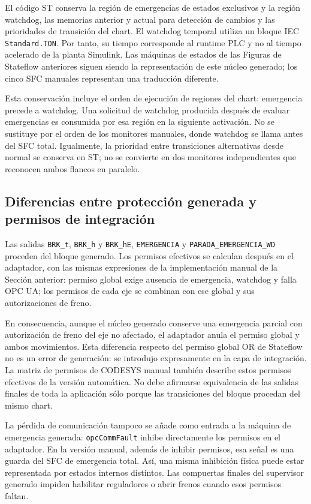 \documentclass[a4paper,10pt,onecolumn,journal]{ieeeconf}
\numberwithin{equation}{section}
\begin{document}
El código ST conserva la región de emergencias de estados exclusivos y la región watchdog, las memorias anterior y actual para detección de cambios y las prioridades de transición del chart. El watchdog temporal utiliza un bloque IEC \texttt{Standard.TON}. Por tanto, su tiempo corresponde al runtime PLC y no al tiempo acelerado de la planta Simulink. Las máquinas de estados de las Figuras de Stateflow anteriores siguen siendo la representación de este núcleo generado; los cinco SFC manuales representan una traducción diferente.

Esta conservación incluye el orden de ejecución de regiones del chart: emergencia precede a watchdog. Una solicitud de watchdog producida después de evaluar emergencias es consumida por esa región en la siguiente activación. No se sustituye por el orden de los monitores manuales, donde watchdog se llama antes del SFC total. Igualmente, la prioridad entre transiciones alternativas desde normal se conserva en ST; no se convierte en dos monitores independientes que reconocen ambos flancos en paralelo.

\subsection{Diferencias entre protección generada y permisos de integración}
Las salidas \texttt{BRK\_t}, \texttt{BRK\_h} y \texttt{BRK\_hE}, \texttt{EMERGENCIA} y \texttt{PARADA\_EMERGENCIA\_WD} proceden del bloque generado. Los permisos efectivos se calculan después en el adaptador, con las mismas expresiones de la implementación manual de la Sección anterior: permiso global exige ausencia de emergencia, watchdog y falla OPC UA; los permisos de cada eje se combinan con ese global y sus autorizaciones de freno.

En consecuencia, aunque el núcleo generado conserve una emergencia parcial con autorización de freno del eje no afectado, el adaptador anula el permiso global y ambos movimientos. Esta diferencia respecto del permiso global OR de Stateflow no es un error de generación: se introdujo expresamente en la capa de integración. La matriz de permisos de CODESYS manual también describe estos permisos efectivos de la versión automática. No debe afirmarse equivalencia de las salidas finales de toda la aplicación sólo porque las transiciones del bloque procedan del mismo chart.

La pérdida de comunicación tampoco se añade como entrada a la máquina de emergencia generada: \texttt{opcCommFault} inhibe directamente los permisos en el adaptador. En la versión manual, además de inhibir permisos, esa señal es una guarda del SFC de emergencia total. Así, una misma inhibición física puede estar representada por estados internos distintos. Las compuertas finales del supervisor generado impiden habilitar reguladores o abrir frenos cuando esos permisos faltan.
\end{document}
